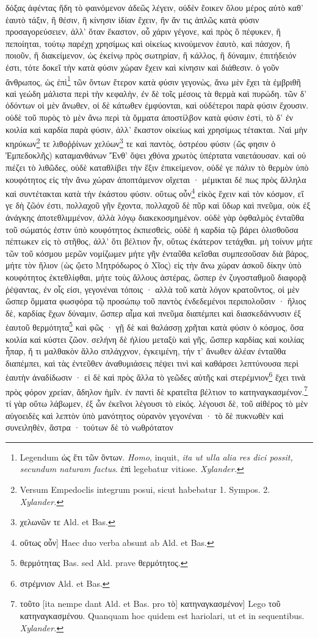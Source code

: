 \documentclass[a4paper, 11pt, oneside, polutonikogreek, german]{article}
\begin{document}
δόξας ἀφέντας ἤδη τὸ φαινόμενον ἀδεῶς λέγειν, οὐδὲν ἔοικεν ὅλου μέρος αὐτὸ καθ' ἑαυτὸ τάξιν, ἢ θέσιν, ἢ κίνησιν ἰδίαν ἔχειν, ἣν ἄν τις ἁπλῶς κατὰ φύσιν προσαγορεύσειεν, ἀλλ' ὅταν ἕκαστον, οὗ χάριν γέγονε, καὶ πρὸς ὃ πέφυκεν, ἢ πεποίηται, τούτῳ παρέχῃ χρησίμως καὶ οἰκείως κινούμενον ἑαυτὸ, καὶ πάσχον, ἢ ποιοῦν, ἢ διακείμενον, ὡς ἐκείνῳ πρὸς σωτηρίαν, ἢ κάλλος, ἢ δύναμιν, ἐπιτήδειόν ἐστι, τότε δοκεῖ τὴν κατὰ φύσιν χώραν ἔχειν καὶ κίνησιν καὶ διάθεσιν. ὁ γοῦν ἄνθρωπος, ὡς ἐπὶ\footnote{Legendum ὡς ἔτι τῶν ὂντων. \emph{Homo}, inquit, \emph{ita ut ulla alia res dici possit, secundum naturam factus}. ἐπὶ legebatur vitiose. \emph{Xylander.}} τῶν ὄντων ἕτερον κατὰ φύσιν γεγονὼς, ἄνω μὲν ἔχει τὰ ἐμβριθῆ καὶ γεώδη μάλιστα περὶ τὴν κεφαλὴν, ἐν δὲ τοῖς μέσοις τὰ θερμὰ καὶ πυρώδη. τῶν δ' ὀδόντων οἱ μὲν ἄνωθεν, οἱ δὲ κάτωθεν ἐμφύονται, καὶ οὐδέτεροι παρὰ φύσιν ἔχουσιν. οὐδὲ τοῦ πυρὸς τὸ μὲν ἄνω περὶ τὰ ὄμματα ἀποστίλβον κατὰ φύσιν ἐστὶ, τὸ δ' ἐν κοιλία καὶ καρδία παρὰ φύσιν, ἀλλ' ἕκαστον οἰκείως καὶ χρησίμως τέτακται. Ναὶ μὴν κηρύκων\footnote{Versum Empedoclis integrum posui, sicut habebatur 1. Sympos. 2. \emph{Xylander.}} τε λιθοῤῥίνων χελύων\footnote{χελωνῶν τε Ald. et Bas.} τε καὶ παντὸς, ὀστρέου φύσιν (ὥς φησιν ὁ Ἐμπεδοκλῆς) καταμανθάνων Ἔνθ' ὄψει χθόνα χρωτὸς ὑπέρτατα ναιετάουσαν. καὶ οὐ πιέζει τὸ λιθῶδες, οὐδὲ καταθλίβει τὴν ἕξιν ἐπικείμενον, οὐδέ γε πάλιν τὸ θερμὸν ὑπὸ κουφότητος εἰς τὴν ἄνω χώραν ἀποπτάμενον οἴχεται · μέμικται δέ πως πρὸς ἄλληλα καὶ συντέτακται κατὰ τὴν ἑκάστου φύσιν. οὕτως οὖν\footnote{οὕτως οὖν] Haec duo verba absunt ab Ald. et Bas.} εἰκὸς ἔχειν καὶ τὸν κόσμον, εἴ γε δὴ ζῶόν ἐστι, πολλαχοῦ γῆν ἔχοντα, πολλαχοῦ δὲ πῦρ καὶ ὕδωρ καὶ πνεῦμα, οὐκ ἐξ ἀνάγκης ἀποτεθλιμμένον, ἀλλὰ λόγῳ διακεκοσμημένον. οὐδὲ γὰρ ὀφθαλμὸς ἐνταῦθα τοῦ σώματός ἐστιν ὑπὸ κουφότητος ἐκπιεσθεὶς, οὐδὲ ἡ καρδία τῷ βάρει ὀλισθοῦσα πέπτωκεν εἰς τὸ στῆθος, ἀλλ' ὅτι βέλτιον ἦν, οὕτως ἑκάτερον τετάχθαι. μὴ τοίνυν μήτε τῶν τοῦ κόσμου μερῶν νομίζωμεν μήτε γῆν ἐνταῦθα κεῖσθαι συμπεσοῦσαν διὰ βάρος, μήτε τὸν ἥλιον (ὡς ᾤετο Μητρόδωρος ὁ Χῖος) εἰς τὴν ἄνω χώραν ἀσκοῦ δίκην ὑπὸ κουφότητος ἐκτεθλίφθαι, μήτε τοὺς ἄλλους ἀστέρας, ὥσπερ ἐν ζυγοσταθμοῦ διαφορᾷ ῥέψαντας, ἐν οἷς εἰσι, γεγονέναι τόποις · αλλὰ τοῦ κατὰ λόγον κρατοῦντος, οἱ μὲν ὥσπερ ὄμματα φωσφόρα τῷ προσώπῳ τοῦ παντὸς ἐνδεδεμένοι περιπολοῦσιν · ἥλιος δὲ, καρδίας ἔχων δύναμιν, ὥσπερ αἷμα καὶ πνεῦμα διαπέμπει καὶ διασκεδάννυσιν ἐξ ἑαυτοῦ θερμότητα\footnote{θερμότητας Bas. sed Ald. prave θερμότητος.} καὶ φῶς · γῇ δὲ καὶ θαλάσσῃ χρῆται κατὰ φύσιν ὁ κόσμος, ὅσα κοιλία καὶ κύστει ζῶον. σελήνη δὲ ἡλίου μεταξὺ καὶ γῆς, ὥσπερ καρδίας καὶ κοιλίας ἧπαρ, ἤ τι μαλθακὸν ἄλλο σπλάγχνον, ἐγκειμένη, τήν τ' ἄνωθεν ἀλέαν ἐνταῦθα διαπέμπει, καὶ τὰς ἐντεῦθεν ἀναθυμιάσεις πέψει τινὶ καὶ καθάρσει λεπτύνουσα περὶ ἑαυτὴν ἀναδίδωσιν · εἰ δὲ καὶ πρὸς ἄλλα τὸ γεῶδες αὐτῆς καὶ στερέμνιον\footnote{στρέμνιον Ald. et Bas.} ἔχει τινὰ πρὸς φόρον χρείαν, ἄδηλον ἡμῖν. ἐν παντὶ δὲ κρατεῖτα βέλτιον το κατηναγκασμένον.\footnote{τοῦτο [ita nempe dant Ald. et Bas. pro τὸ] κατηναγκασμένον] Lego τοῦ κατηναγκασμένου. Quanquam hoc quidem est hariolari, ut et in sequentibus. \emph{Xylander.}} τί γὰρ οὕτω λάβωμεν, ἐξ ὧν ἐκεῖνοι λέγουσι τὸ εἰκός. λέγουσι δὲ, τοῦ αἰθέρος τὸ μὲν αὐγοειδὲς καὶ λεπτὸν ὑπὸ μανότητος οὐρανὸν γεγονέναι · τὸ δὲ πυκνωθὲν καὶ συνειληθὲν, ἄστρα · τούτων δὲ τὸ νωθρότατον 
\end{document}
